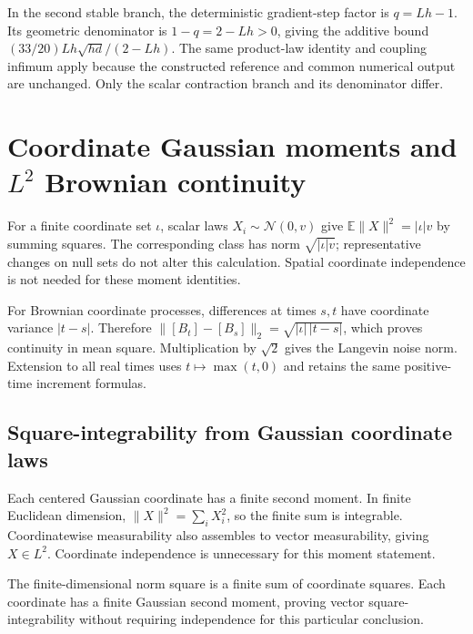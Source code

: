 \documentclass[11pt,a4paper]{report}
\begin{document}
In the second stable branch, the deterministic gradient-step factor is \(q=Lh-1\). Its geometric denominator is \(1-q=2-Lh>0\), giving the additive bound \((33/20)Lh\sqrt{hd}/(2-Lh)\). The same product-law identity and coupling infimum apply because the constructed reference and common numerical output are unchanged. Only the scalar contraction branch and its denominator differ.

\section{\texorpdfstring{Coordinate Gaussian moments and \(L^2\) Brownian continuity}{Coordinate Gaussian moments and L² Brownian continuity}}
\label{proof-module-UnadjustedLangevin-GaussianCoordinates-lean}


For a finite coordinate set \(\iota\), scalar laws \(X_i\sim\mathcal N(0,v)\) give \(\mathbb E\|X\|^2=|\iota|v\) by summing squares. The corresponding class has norm \(\sqrt{|\iota|v}\); representative changes on null sets do not alter this calculation. Spatial coordinate independence is not needed for these moment identities.



For Brownian coordinate processes, differences at times \(s,t\) have coordinate variance \(|t-s|\). Therefore \(\|[B_t]-[B_s]\|_2=\sqrt{|\iota|\,|t-s|}\), which proves continuity in mean square. Multiplication by \(\sqrt2\) gives the Langevin noise norm. Extension to all real times uses \(t\mapsto\max(t,0)\) and retains the same positive-time increment formulas.

\subsection{\texorpdfstring{Square-integrability from Gaussian coordinate laws}{Square-integrability from Gaussian coordinate laws}}
\label{report-step-UnadjustedLangevin-GaussianCoordinates-lean-1}


Each centered Gaussian coordinate has a finite second moment. In finite Euclidean dimension, \(\|X\|^2=\sum_iX_i^2\), so the finite sum is integrable. Coordinatewise measurability also assembles to vector measurability, giving \(X\in L^2\). Coordinate independence is unnecessary for this moment statement.



The finite-dimensional norm square is a finite sum of coordinate squares. Each coordinate has a finite Gaussian second moment, proving vector square-integrability without requiring independence for this particular conclusion.
\end{document}
